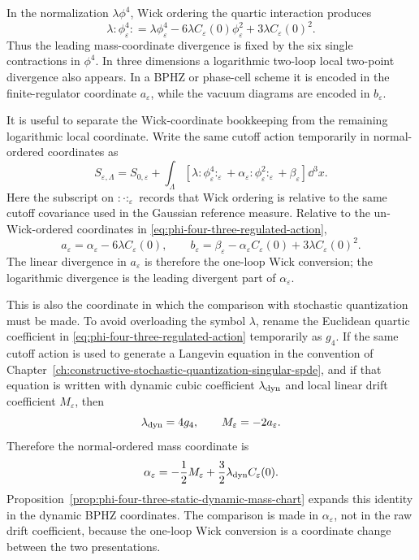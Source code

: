 In the normalization \(\lambda\phi^4\), Wick ordering the quartic interaction
produces
\begin{equation}
  \lambda:\!\phi_\varepsilon^4\!:
  =
  \lambda\phi_\varepsilon^4
  -6\lambda C_\varepsilon(0)\phi_\varepsilon^2
  +3\lambda C_\varepsilon(0)^2.
  \label{eq:phi-four-three-wick-coordinate-shift}
\end{equation}
Thus the leading mass-coordinate divergence is fixed by the six single
contractions in \(\phi^4\).  In three dimensions a logarithmic two-loop
local two-point divergence also appears.  In a BPHZ or phase-cell scheme it
is encoded in the finite-regulator coordinate \(a_\varepsilon\), while the
vacuum diagrams are encoded in \(b_\varepsilon\).

It is useful to separate the Wick-coordinate bookkeeping from the remaining
logarithmic local coordinate.  Write the same cutoff action temporarily in
normal-ordered coordinates as
\begin{equation}
  S_{\varepsilon,\Lambda}
  =
  S_{0,\varepsilon}
  +
  \int_\Lambda
  \left[
    \lambda:\!\phi_\varepsilon^4\!:_\varepsilon
    +\alpha_\varepsilon:\!\phi_\varepsilon^2\!:_\varepsilon
    +\beta_\varepsilon
  \right]\dd^3x .
  \label{eq:phi-four-three-normal-ordered-coordinates}
\end{equation}
Here the subscript on \(:\cdot:_\varepsilon\) records that Wick ordering is
relative to the same cutoff covariance used in the Gaussian reference
measure.  Relative to the un-Wick-ordered coordinates in
\eqref{eq:phi-four-three-regulated-action},
\begin{equation}
  a_\varepsilon
  =
  \alpha_\varepsilon-6\lambda C_\varepsilon(0),
  \qquad
  b_\varepsilon
  =
  \beta_\varepsilon-\alpha_\varepsilon C_\varepsilon(0)
  +3\lambda C_\varepsilon(0)^2 .
  \label{eq:phi-four-three-coordinate-conversion}
\end{equation}
The linear divergence in \(a_\varepsilon\) is therefore the one-loop Wick
conversion; the logarithmic divergence is the leading divergent part of
\(\alpha_\varepsilon\).

This is also the coordinate in which the comparison with stochastic
quantization must be made.  To avoid overloading the symbol \(\lambda\), rename
the Euclidean quartic coefficient in
\eqref{eq:phi-four-three-regulated-action} temporarily as \(g_4\).  If the
same cutoff action is used to generate a Langevin equation in the convention of
Chapter~\ref{ch:constructive-stochastic-quantization-singular-spde}, and if
that equation is written with dynamic cubic coefficient \(\lambda_{\rm dyn}\)
and local linear drift coefficient \(M_\varepsilon\), then
\[
  \lambda_{\rm dyn}=4g_4,\qquad
  M_\varepsilon=-2a_\varepsilon .
\]
Therefore the normal-ordered mass coordinate is
\[
  \alpha_\varepsilon
  =
  -\frac12 M_\varepsilon
  +\frac32\lambda_{\rm dyn}C_\varepsilon(0).
\]
Proposition~\ref{prop:phi-four-three-static-dynamic-mass-chart} expands this
identity in the dynamic BPHZ coordinates.  The comparison is made in
\(\alpha_\varepsilon\), not in the raw drift coefficient, because the one-loop
Wick conversion is a coordinate change between the two presentations.

